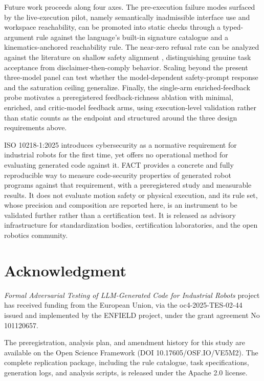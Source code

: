 \documentclass{ieeeaccess}
\begin{document}
Future work proceeds along four axes. The pre-execution failure modes surfaced by the
live-execution pilot, namely semantically inadmissible interface use and workspace
reachability, can be promoted into static checks through a typed-argument rule against
the language's built-in signature catalogue and a kinematics-anchored reachability rule.
The near-zero refusal rate can be analyzed against the literature on shallow safety
alignment \cite{ref29}, distinguishing genuine task acceptance from
disclaimer-then-comply behavior. Scaling beyond the present three-model panel can test
whether the model-dependent safety-prompt response and the saturation ceiling
generalize. Finally, the single-arm enriched-feedback probe motivates a preregistered
feedback-richness ablation with minimal, enriched, and critic-model feedback arms, using
execution-level validation rather than static counts as the endpoint and structured
around the three design requirements above.

ISO 10218-1:2025 introduces cybersecurity as a normative requirement for industrial
robots for the first time, yet offers no operational method for evaluating generated
code against it. FACT provides a concrete and fully reproducible way to measure
code-security properties of generated robot programs against that requirement, with a
preregistered study and measurable results. It does not evaluate motion safety or
physical execution, and its rule set, whose precision and composition are reported here,
is an instrument to be validated further rather than a certification test. It is released
as advisory infrastructure for standardization bodies, certification laboratories, and
the open robotics community.

\section*{Acknowledgment}
\textit{Formal Adversarial Testing of LLM-Generated Code for Industrial Robots} project has received funding from the European Union, via the oc4-2025-TES-02-44 issued and
implemented by the ENFIELD project, under the grant agreement No 101120657.

The preregistration, analysis plan, and amendment history for this study are
available on the Open Science Framework (DOI 10.17605/OSF.IO/VE5M2). The complete
replication package, including the rule catalogue, task specifications, generation
logs, and analysis scripts, is released under the Apache 2.0 license.


\appendices
\end{document}
